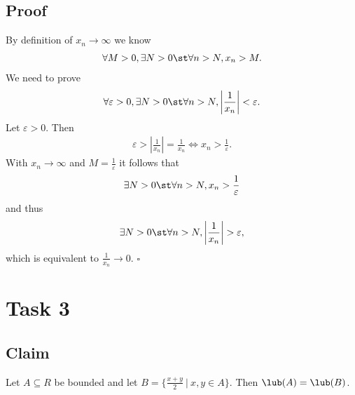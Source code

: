 \documentclass{article}
\begin{document}
\subsection*{Proof}
By definition of $x_n\to\infty$ we know
\begin{align*}
	\forall M > 0, \exists N> 0 \st \forall n > N, x_n > M.
\end{align*}
We need to prove
\begin{align*}
	\forall \varepsilon > 0, \exists N > 0\st \forall n > N, \left|\frac{1}{x_n}\right|<\varepsilon.
\end{align*}
Let $\varepsilon > 0$. Then
\begin{align*}
	\varepsilon > \left|\frac{1}{x_n}\right| = \frac{1}{x_n} \Leftrightarrow x_n > \frac{1}{\varepsilon}.
\end{align*}
With $x_n\to \infty$ and $M=\frac{1}{\varepsilon}$ it follows that
\begin{align*}
	\exists N > 0 \st \forall n > N, x_n > \frac{1}{\varepsilon}
\end{align*}
and thus
\begin{align*}
	\exists N > 0 \st \forall n > N, \left|\frac{1}{x_n}\right|>\varepsilon,
\end{align*}
which is equivalent to $\frac{1}{x_n}\to 0$. $\square$
\section*{Task 3}
\subsection*{Claim}
Let $A\subseteq R$ be bounded and let $B=\{\frac{x+y}{2}\:|\:x,y\in A\}$. Then $\lub(A)=\lub(B)$.
\end{document}
